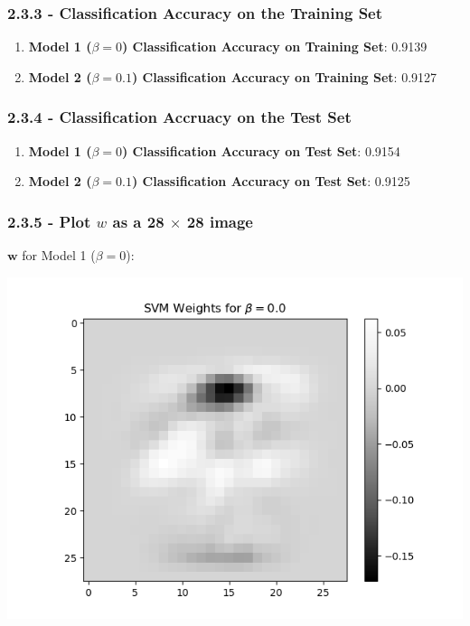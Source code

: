 \documentclass[10pt]{article}
\begin{document}
\subsubsection{2.3.3 - Classification Accuracy on the Training Set}

\begin{enumerate}
\item \textbf{Model 1 ($\beta = 0 $) Classification Accuracy on Training Set}: 0.9139
\item \textbf{Model 2 ($\beta = 0.1 $) Classification Accuracy on Training Set}: 0.9127
\end{enumerate}

\subsubsection{2.3.4 - Classification Accruacy on the Test Set}

\begin{enumerate}
\item \textbf{Model 1 ($\beta = 0 $) Classification Accuracy on Test Set}: 0.9154
\item \textbf{Model 2 ($\beta = 0.1 $) Classification Accuracy on Test Set}: 0.9125
\end{enumerate}


\subsubsection{2.3.5 - Plot \textbf{$w$} as a 28 $\times $ 28 image }

$\textbf{w}$ for Model 1 ($\beta = 0 $): 

\begin{center}
\includegraphics[scale=0.5]{2_3_1.png}
\end{center}
\end{document}
